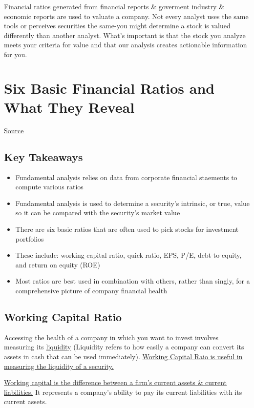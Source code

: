 \documentclass{article}
\begin{document}
	Financial ratios generated from financial reports \& goverment industry \& economic reports are used to valuate a company. Not every analyst uses the same tools or perceives securities the same-you
	might determine a stock is valued differently than another analyst. What's important is that the stock you analyze meets your criteria for value and that our analysis creates actionable information
	for you.

	\section{Six Basic Financial Ratios and What They Reveal}
	\href{https://www.investopedia.com/financial-edge/0910/6-basic-financial-ratios-and-what-they-tell-you.aspx}{Source}

	\subsection{Key Takeaways}
	\begin{itemize}
		\item{Fundamental analysis relies on data from corporate financial staements to compute various ratios}
		\item{Fundamental analysis is used to determine a security's intrinsic, or true, value so it can be compared with the security's market value}
		\item{There are six basic ratios that are often used to pick stocks for investment portfolios}
		\item{These include: working capital ratio, quick ratio, EPS, P/E, debt-to-equity, and return on equity (ROE)}
		\item{Most ratios are best used in combination with others, rather than singly, for a comprehensive picture of company financial health}
	\end{itemize}

	\subsection{Working Capital Ratio}
	Accessing the health of a company in which you want to invest involves measuring its \href{https://www.investopedia.com/terms/l/liquidity.asp}{liquidity} (Liquidity refers to how easily a company
	can convert its assets in cash that can be used immediately). \underline{Working Capital Raio is useful in measuring the liquidity of a security.} \newline

	\underline{\href{https://www.investopedia.com/terms/w/workingcapital.asp}{Working capital} is the difference between a firm's current assets \& current liabilities.} It represents a company's ability
	to pay its current liabilities with its current assets. \newline
\end{document}

